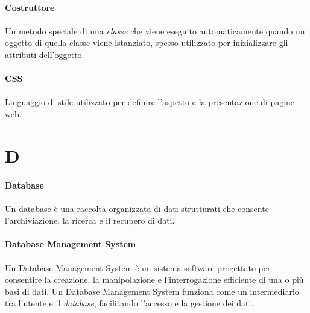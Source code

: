 \documentclass[10pt, a4paper]{article}
\begin{document}
\vspace{2em}
\paragraph{Costruttore}\noindent\hrulefill
\paragraph{}Un metodo speciale di una \textit{classe\pg} che viene eseguito automaticamente quando un oggetto di quella classe viene istanziato, spesso utilizzato per inizializzare gli attributi dell'oggetto.

\vspace{2em}
\paragraph{CSS}\noindent\hrulefill
\paragraph{}Linguaggio di stile utilizzato per definire l'aspetto e la presentazione di pagine web.



\newpage
\section{D}
\vspace{2em}
\paragraph{Database}\noindent\hrulefill
\paragraph{}Un database è una raccolta organizzata di dati strutturati che consente l'archiviazione, la ricerca e il recupero di dati.

\vspace{2em}
\paragraph{Database Management System}\noindent\hrulefill
\paragraph{}Un Database Management System è un sistema software progettato per consentire la creazione, la manipolazione e l’interrogazione efficiente di una o più basi di dati. Un Database Management System funziona come un intermediario tra l’utente e il \textit{database\pg}, facilitando l’accesso e la gestione dei dati.
\end{document}
